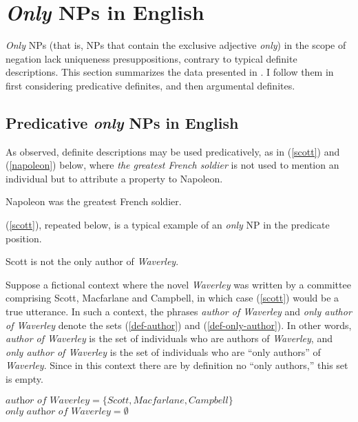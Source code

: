 \section{\textit{Only} NPs in English \label{sec:only-nps-english}}

\textit{Only} NPs (that is, NPs that contain the exclusive adjective \textit{only}) in the scope of negation lack uniqueness presuppositions, contrary to typical definite descriptions. This section summarizes the data presented in \citet{cb2012b, cb2015}. I follow them in first considering predicative definites, and then argumental definites.

\subsection{Predicative \textit{only} NPs in English}
As \citet{strawson50} observed, definite descriptions may be used predicatively, as in (\ref{scott}) and (\ref{napoleon}) below, where \textit{the greatest French soldier} is not used to mention an individual but to attribute a property to Napoleon.

\begin{exe}
	\ex \label{napoleon} Napoleon was the greatest French soldier.
\end{exe}

(\ref{scott}), repeated below, is a typical example of an \textit{only} NP in the predicate position.

\begin{exe}
	 Scott is not the only author of \textit{Waverley}.
\end{exe}

Suppose a fictional context where the novel \textit{Waverley} was written by a committee comprising Scott, Macfarlane and Campbell, in which case (\ref{scott}) would be a true utterance. In such a context, the phrases \textit{author of Waverley} and \textit{only author of Waverley} denote the sets (\ref{def-author}) and (\ref{def-only-author}). In other words, \textit{author of Waverley} is the set of individuals who are authors of \textit{Waverley}, and \textit{only author of Waverley} is the set of individuals who are ``only authors'' of \textit{Waverley}. Since in this context there are by definition no ``only authors,'' this set is empty.

\begin{exe}
	\ex \label{def-author} $\textit{author of Waverley} = \lbrace Scott, Macfarlane, Campbell \rbrace$
	\ex \label{def-only-author} $\textit{only author of Waverley} = \emptyset$
\end{exe}

